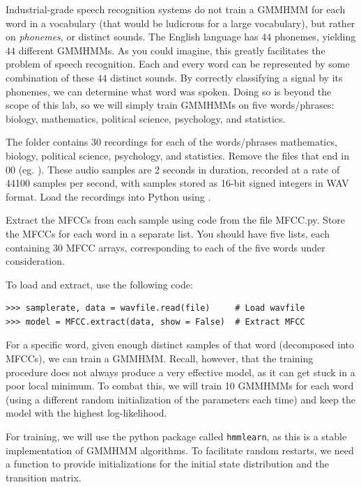Industrial-grade speech recognition systems do not train a GMMHMM for each word in a vocabulary (that would be ludicrous for a large vocabulary), but rather on \emph{phonemes}, or distinct sounds. The English language has $44$ phonemes, yielding $44$ different GMMHMMs. As you could imagine, this greatly facilitates the problem of speech recognition.  Each and every word can be represented by some combination of these $44$ distinct sounds.  By correctly classifying a signal by its phonemes, we can determine what word was spoken. Doing so is beyond the scope of this lab, so we will simply train GMMHMMs on five words/phrases: biology, mathematics, political science, psychology, and statistics.

\begin{problem}
The  folder contains 30 recordings for each of the words/phrases mathematics, biology, political science, psychology, and statistics. 
Remove the files that end in 00 (eg. ).
These audio samples are 2 seconds in duration, recorded at a rate of 44100 samples per second, with samples stored as 16-bit signed integers in WAV format. 
Load the recordings into Python using .

Extract the MFCCs from each sample using code from the file MFCC.py. 
Store the MFCCs for each word in a separate list. 
You should have five lists, each containing 30 MFCC arrays, corresponding to each of the five words under consideration. 

To load and extract, use the following code:

\begin{lstlisting}
>>> samplerate, data = wavfile.read(file)     # Load wavfile 
>>> model = MFCC.extract(data, show = False)  # Extract MFCC
\end{lstlisting}
\end{problem}

For a specific word, given enough distinct samples of that word (decomposed into MFCCs), we can train a GMMHMM.
Recall, however, that the training procedure does not always produce a very effective model, as it can get stuck in a poor local minimum. 
To combat this, we will train 10 GMMHMMs for each word (using a different random initialization of the parameters each time)
and keep the model with the highest log-likelihood.

For training, we will use the python package called {\tt hmmlearn}, as this is a stable implementation of GMMHMM algorithms.
To facilitate random restarts, we need a function to provide initializations for the initial state distribution and the transition matrix.

